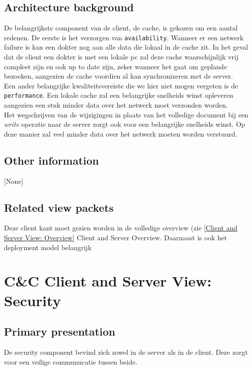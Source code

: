\documentclass[a4paper,10pt]{article}
\begin{document}
\subsection{Architecture background}
De belangrijkste component van de client, de cache, is gekozen om een aantal redenen.  De eerste is het verzorgen van \texttt{availability}.  Wanneer er een netwerk failure is kan een dokter nog aan alle data die lokaal in de cache zit.  In het geval dat de client een dokter is met een lokale pc zal deze cache waarschijnlijk vrij compleet zijn en ook up to date zijn, zeker wanneer het gaat om geplande bezoeken, aangezien de cache voordien al kan synchronizeren met de server.\\
Een ander belangrijke kwaliteitsvereiste die we hier niet mogen vergeten is de \texttt{performance}.  Een lokale cache zal een belangrijke snelheids winst opleveren aangezien een stuk minder data over het netwerk moet verzonden worden.\\
Het wegschrijven van de wijzigingen in plaats van het volledige document bij een \textit{write} operatie naar de server zorgt ook voor een belangrijke snelheids winst.  Op deze manier zal veel minder data over het netwerk moeten worden verstuurd.

\subsection{Other information}
[None]

\subsection{Related view packets}
Deze client kant moet gezien worden in de volledige overview (zie \ref{Client and Server View: Overview} Client and Server Overview.  Daarnaast is ook het deployment model belangrijk


\clearpage
\section{C\&C Client and Server View: Security}
\label{Client and Server View: Security}

\subsection{Primary presentation}
De security component bevind zich zowel in de server als in de client. Deze zorgt voor een veilige communucatie tussen beide.
\end{document}

